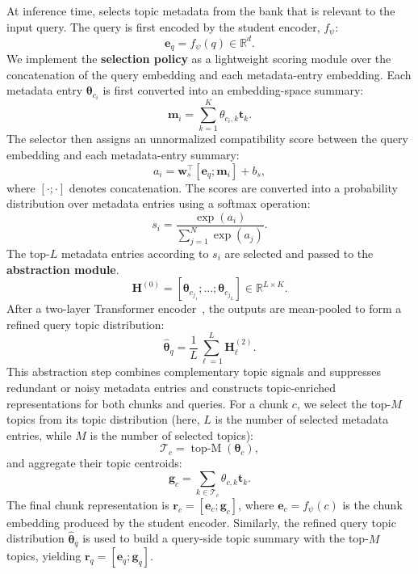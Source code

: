 At inference time, \name{} selects topic metadata from the bank that is relevant to the input query. The query is first encoded by the student encoder, $f_{\psi}$:
\begin{equation}
    \mathbf{e}_q = f_{\psi}(q) \in \mathbb{R}^{d}.
\end{equation}
We implement the \textbf{selection policy} as a lightweight scoring module over the concatenation of the query embedding and each metadata-entry embedding. Each metadata entry $\boldsymbol{\theta}_{c_i}$ is first converted into an embedding-space summary:
\begin{equation}
    \mathbf{m}_i = \sum_{k=1}^{K} \theta_{c_i,k}\mathbf{t}_k .
\end{equation}
The selector then assigns an unnormalized compatibility score between the query embedding and each metadata-entry summary:
\begin{equation}
    a_i = \mathbf{w}_s^\top [\mathbf{e}_q ; \mathbf{m}_i] + b_s ,
\end{equation}
where $[\cdot;\cdot]$ denotes concatenation. The scores are converted into a probability distribution over metadata entries using a softmax operation:
\begin{equation}
    s_i =
    \frac{\exp(a_i)}
    {\sum_{j=1}^{N} \exp(a_j)} .
\end{equation}
The top-$L$ metadata entries according to $s_i$ are selected and passed to the \textbf{abstraction module}.
\begin{equation}
    \mathbf{H}^{(0)}
    =
    [\boldsymbol{\theta}_{c_{j_1}};\ldots;\boldsymbol{\theta}_{c_{j_L}}]
    \in \mathbb{R}^{L \times K}.
\end{equation}
After a two-layer Transformer encoder~\cite{NIPS2017_3f5ee243}, the outputs are mean-pooled to form a refined query topic distribution:
\begin{equation}
    \hat{\boldsymbol{\theta}}_q =
    \frac{1}{L}\sum_{\ell=1}^{L} \mathbf{H}^{(2)}_{\ell}.
\end{equation}
This abstraction step combines complementary topic signals and suppresses redundant or noisy metadata entries and constructs topic-enriched representations for both chunks and queries. For a chunk $c$, we select the top-$M$ topics from its topic distribution (here, $L$ is the number of selected metadata entries, while $M$ is the number of selected topics):
\begin{equation}
    \mathcal{T}_c = \operatorname{top\text{-}M}(\boldsymbol{\theta}_c),
\end{equation}
and aggregate their topic centroids:
\begin{equation}
    \mathbf{g}_c =
    \sum_{k \in \mathcal{T}_c}
    \theta_{c,k}\mathbf{t}_k .
\end{equation}
The final chunk representation is $\mathbf{r}_c = [\mathbf{e}_c ; \mathbf{g}_c]$, where $\mathbf{e}_c=f_{\psi}(c)$ is the chunk embedding produced by the student encoder. Similarly, the refined query topic distribution $\hat{\boldsymbol{\theta}}_q$ is used to build a query-side topic summary with the top-$M$ topics, yielding $\mathbf{r}_q = [\mathbf{e}_q ; \mathbf{g}_q]$.

